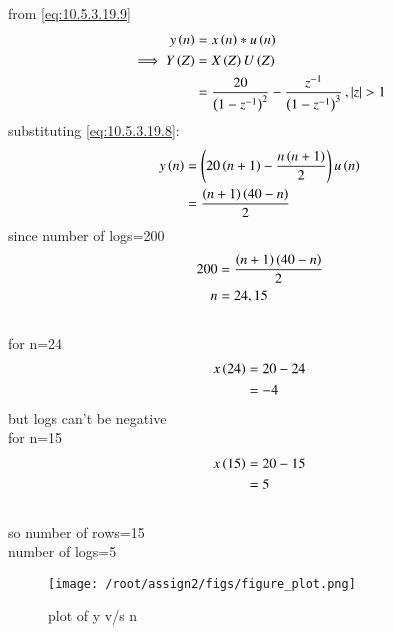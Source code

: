 \documentclass[journal,12pt,twocolumn]{IEEEtran}
\theoremstyle{remark}
\begin{document}
from \eqref{eq:10.5.3.19.9}
\begin{align}
y\left(n\right)&=x\left(n\right)*u\left(n\right)
\\\implies Y\left(Z\right)&=X\left(Z\right)U\left(Z\right)
\\&=\frac{20}{\left(1-z^{-1}\right)^2}-\frac{z^{-1}}{\left(1-z^{-1}\right)^3}\,,\left\vert z\right\vert>1
\end{align}
substituting  \eqref{eq:10.5.3.19.8}:
\begin{align}
y\left(n\right)&=\left(20\left(n+1\right)-\frac{n\left(n+1\right)}{2}\right)u\left(n\right)
\\&=\frac{\left(n+1\right)\left(40-n\right)}{2}
\end{align}
since number of logs=200
\begin{align}
 200&=\frac{\left(n+1\right)\left(40-n\right)}{2}   
\\n&=24,15
\end{align}
\\for n=24
\begin{align}
x\left(24\right)&=20-24
\\&={-4}
\end{align}
but logs can't be negative
\\for n=15
\begin{align}
x\left(15\right)&=20-15
\\&=5
\end{align}
\\so number of rows=15
\\number of logs=5
\\\begin{figure}[h]
  \renewcommand\thefigure{1}
    \centering
    \texttt{[image: /root/assign2/figs/figure\_plot.png]}
    \caption{plot of y v/s n}
\end{figure}
\end{document}
